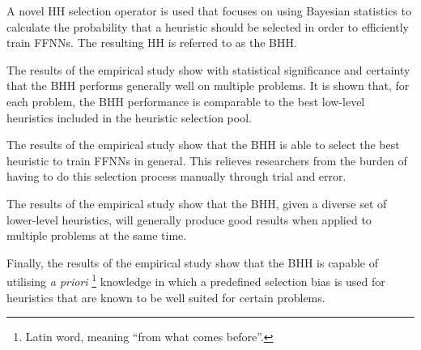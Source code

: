 \begin{highlights}
	\item A novel \acf{HH} selection operator is used that focuses on using Bayesian statistics to calculate the probability that a heuristic should be selected in order to efficiently train \acfp{FFNN}. The resulting \acs{HH} is referred to as the \acf{BHH}.

	\item The results of the empirical study show with statistical significance and certainty that the \acs{BHH} performs generally well on multiple problems. It is shown that, for each problem, the \acs{BHH} performance is comparable to the best low-level heuristics included in the heuristic selection pool.

	\item The results of the empirical study show that the \acs{BHH} is able to select the best heuristic to train \acp{FFNN} in general. This relieves researchers from the burden of having to do this selection process manually through trial and error.

	\item The results of the empirical study show that the \acs{BHH}, given a diverse set of lower-level heuristics, will generally produce good results when applied to multiple problems at the same time.

	\item Finally, the results of the empirical study show that the \acs{BHH} is capable of utilising \textit{a priori} \footnote{Latin word, meaning ``from what comes before''.} knowledge in which a predefined selection bias is used for heuristics that are known to be well suited for certain problems.
\end{highlights}